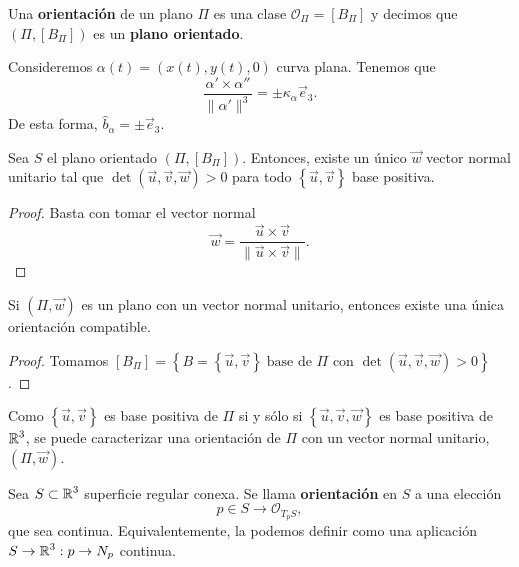 \begin{definition}
	Una \textbf{orientación} de un plano $\displaystyle \Pi $ es una clase $\displaystyle \mathcal{O}_{\Pi }=\left[B_{\Pi}\right]  $ y decimos que $\displaystyle \left(\Pi, \left[B_{\Pi}\right] \right) $ es un \textbf{plano orientado}. 
\end{definition}
\begin{eg}
Consideremos $\displaystyle \alpha\left(t\right)=\left(x\left(t\right), y\left(t\right), 0\right) $ curva plana. Tenemos que 
\[\frac{\alpha'\times\alpha''}{\|\alpha'\|^{3}} = \pm\kappa_{\alpha }\vec{e}_{3} .\]
De esta forma, $\displaystyle \hat{b}_{\alpha }=\pm\vec{e}_{3} $.
\end{eg}
\begin{prop}
	Sea $\displaystyle S $ el plano orientado $\displaystyle \left(\Pi, \left[B_{\Pi}\right] \right) $. Entonces, existe un único $\displaystyle \vec{w} $ vector normal unitario tal que $\displaystyle \det\left(\vec{u}, \vec{v}, \vec{w}\right) > 0 $ para todo $\displaystyle \left\{ \vec{u}, \vec{v}\right\}  $ base positiva. 
\end{prop}
\begin{proof}
	 Basta con tomar el vector normal
	\[\vec{w}=\frac{\vec{u} \times \vec{v}}{\|\vec{u} \times \vec{v}\|} .\]
\end{proof}
\begin{colorary}
Si $\displaystyle \left(\Pi, \vec{w}\right) $ es un plano con un vector normal unitario, entonces existe una única orientación compatible. 
\end{colorary}
\begin{proof}
	Tomamos $\displaystyle \left[B_{\Pi}\right] = \left\{ B = \left\{ \vec{u}, \vec{v}\right\} \; \text{base de }\Pi \text{ con } \det\left(\vec{u}, \vec{v}, \vec{w}\right) > 0\right\}  $. 
\end{proof}
\begin{observation}
Como $\displaystyle \left\{ \vec{u}, \vec{v}\right\}  $ es base positiva de $\displaystyle \Pi $ si y sólo si $\displaystyle \left\{ \vec{u}, \vec{v}, \vec{w}\right\}  $ es base positiva de $\displaystyle \mathbb{R}^{3} $, se puede caracterizar una orientación de $\displaystyle \Pi  $ con un vector normal unitario, $\displaystyle \left(\Pi, \vec{w}\right) $. 
\end{observation}
\begin{definition}
Sea $\displaystyle S\subset\mathbb{R}^{3} $ superficie regular conexa. 
 Se llama \textbf{orientación} en $\displaystyle S $ a una elección 
\[p \in S \to \mathcal{O}_{T_{p}S} ,\]
que sea continua. Equivalentemente,  la podemos definir como una aplicación $\displaystyle S \to \mathbb{R}^{3} : p \to N_{p} $ continua. 
\end{definition}
